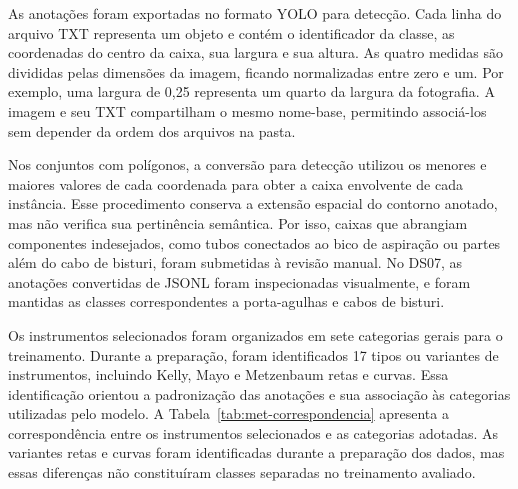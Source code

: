 As anotações foram exportadas no formato YOLO para detecção. Cada linha do arquivo TXT representa um objeto e contém o identificador da classe, as coordenadas do centro da caixa, sua largura e sua altura. As quatro medidas são divididas pelas dimensões da imagem, ficando normalizadas entre zero e um. Por exemplo, uma largura de 0,25 representa um quarto da largura da fotografia. A imagem e seu TXT compartilham o mesmo nome-base, permitindo associá-los sem depender da ordem dos arquivos na pasta.

Nos conjuntos com polígonos, a conversão para detecção utilizou os menores e maiores valores de cada coordenada para obter a caixa envolvente de cada instância. Esse procedimento conserva a extensão espacial do contorno anotado, mas não verifica sua pertinência semântica. Por isso, caixas que abrangiam componentes indesejados, como tubos conectados ao bico de aspiração ou partes além do cabo de bisturi, foram submetidas à revisão manual. No DS07, as anotações convertidas de JSONL foram inspecionadas visualmente, e foram mantidas as classes correspondentes a porta-agulhas e cabos de bisturi.


Os instrumentos selecionados foram organizados em sete categorias gerais para o treinamento. Durante a preparação, foram identificados 17 tipos ou variantes de instrumentos, incluindo Kelly, Mayo e Metzenbaum retas e curvas. Essa identificação orientou a padronização das anotações e sua associação às categorias utilizadas pelo modelo. A Tabela~\ref{tab:met-correspondencia} apresenta a correspondência entre os instrumentos selecionados e as categorias adotadas. As variantes retas e curvas foram identificadas durante a preparação dos dados, mas essas diferenças não constituíram classes separadas no treinamento avaliado.


